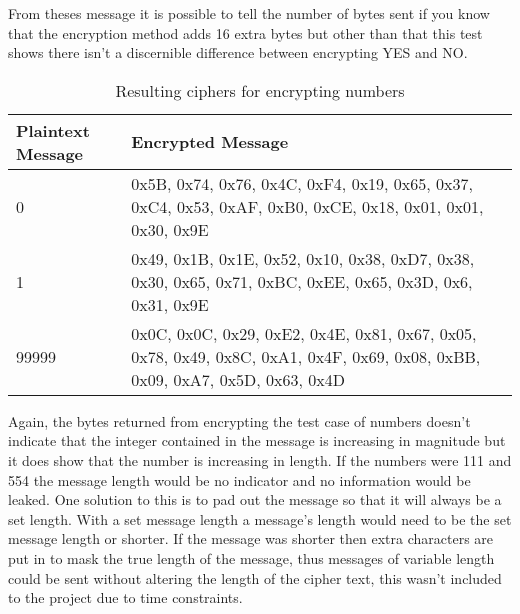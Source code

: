 From theses message it is possible to tell the number of bytes sent if you know that the encryption method adds 16 extra bytes but other than that this test shows there isn't a discernible difference between encrypting YES and NO.

\begin{table}[H]
	\centering
	\begin{tabular}{ | l | p{7cm} | }
	\hline
	Plaintext Message & Encrypted Message \\ \hline
	0 & 0x5B, 0x74, 0x76, 0x4C, 0xF4, 0x19, 0x65, 0x37, 0xC4, 0x53, 0xAF, 0xB0, 0xCE, 0x18, 0x01, 0x01, 0x30, 0x9E \\ \hline
	1 & 0x49, 0x1B, 0x1E, 0x52, 0x10, 0x38, 0xD7, 0x38, 0x30, 0x65, 0x71, 0xBC, 0xEE, 0x65, 0x3D, 0x6, 0x31, 0x9E\\ \hline
	99999 & 0x0C, 0x0C, 0x29, 0xE2, 0x4E, 0x81, 0x67, 0x05, 0x78, 0x49, 0x8C, 0xA1, 0x4F, 0x69, 0x08, 0xBB, 0x09, 0xA7, 0x5D, 0x63, 0x4D \\ \hline
	\end{tabular}
	\caption{Resulting ciphers for encrypting numbers}
	\label{tab:9999}
\end{table}

Again, the bytes returned from encrypting the test case of numbers doesn't indicate that the integer contained in the message is increasing in magnitude but it does show that the number is increasing in length. If the numbers were 111 and 554 the message length would be no indicator and no information would be leaked. One solution to this is to pad out the message so that it will always be a set length. With a set message length a message's length would need to be the set message length or shorter. If the message was shorter then extra characters are put in to mask the true length of the message, thus messages of variable length could be sent without altering the length of the cipher text, this wasn't included to the project due to time constraints.  



